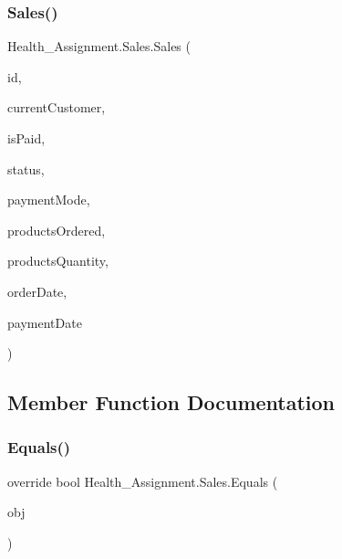 \mbox{\label{class_health___assignment_1_1_sales_adc0cc4e815eca662714b7dfae8c35084}} 
\subsubsection{\texorpdfstring{Sales()}{Sales()}\hspace{0.1cm}{\footnotesize\ttfamily [3/3]}}
{\footnotesize\ttfamily Health\+\_\+\+Assignment.\+Sales.\+Sales (\begin{DoxyParamCaption}\item[{int}]{id,  }\item[{\hyperlink{class_health___assignment_1_1_customer}{Customer}}]{current\+Customer,  }\item[{Boolean}]{is\+Paid,  }\item[{string}]{status,  }\item[{string}]{payment\+Mode,  }\item[{List$<$ \hyperlink{class_health___assignment_1_1_product}{Product} $>$}]{products\+Ordered,  }\item[{List$<$ int $>$}]{products\+Quantity,  }\item[{Date\+Time}]{order\+Date,  }\item[{Date\+Time}]{payment\+Date }\end{DoxyParamCaption})\hspace{0.3cm}{\ttfamily [inline]}}



\subsection{Member Function Documentation}
\mbox{\label{class_health___assignment_1_1_sales_aa1c187315eded971605959f6930d839c}} 
\subsubsection{\texorpdfstring{Equals()}{Equals()}}
{\footnotesize\ttfamily override bool Health\+\_\+\+Assignment.\+Sales.\+Equals (\begin{DoxyParamCaption}\item[{object}]{obj }\end{DoxyParamCaption})\hspace{0.3cm}{\ttfamily [inline]}}

